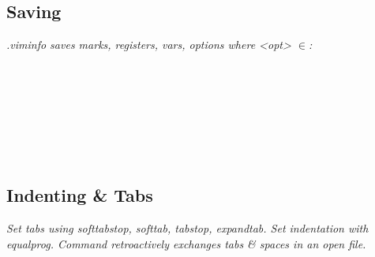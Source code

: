 \subsection*{Saving}
\textit{.viminfo saves marks, registers, vars, options  where <opt> $\in$:}\\
\\
\\
\\
\\
\\
\\
\\

\subsection*{Indenting \& Tabs}

\textit{Set tabs using softtabstop, softtab, tabstop, expandtab.  Set indentation with equalprog.  Command  retroactively exchanges tabs \& spaces in an open file. }\\
\ \\